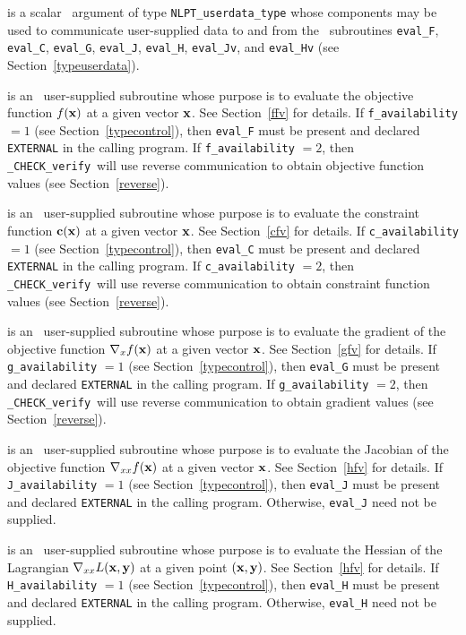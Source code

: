 \documentclass{galahad}
\newcommand{\packagename}{CHECK}
\newcommand{\fullpackagename}{\libraryname\_\packagename}
\newcommand{\solver}{{\tt \fullpackagename\_verify}}
\begin{document}
\begin{description}
 is a scalar \intentinout\ argument of type 
{\tt NLPT\_userdata\_type} whose components may be used
to communicate user-supplied data to and from the
\optional\ subroutines
{\tt eval\_F}, {\tt eval\_C}, {\tt eval\_G}, {\tt eval\_J},
{\tt eval\_H}, {\tt eval\_Jv}, and {\tt eval\_Hv}
(see Section~\ref{typeuserdata}). 

 is an \optional\ 
user-supplied subroutine whose purpose is to evaluate the 
objective function $f({\mathbf{x}})$ at a given vector ${\mathbf{x}}$.
See Section~\ref{ffv} for details.
If {\tt f\_availability} $=1$ (see Section~\ref{typecontrol}), then {\tt eval\_F}
must be present and declared {\tt EXTERNAL} in the calling program.
If {\tt f\_availability} $=2$, then \solver\ will use reverse communication to
obtain objective function values (see Section~\ref{reverse}).

 is an \optional\ 
user-supplied subroutine whose purpose is to evaluate the 
constraint function ${\mathbf{c}}({\mathbf{x}})$ at a given vector ${\mathbf{x}}$.
See Section~\ref{cfv} for details.
If {\tt c\_availability} $=1$ (see Section~\ref{typecontrol}), then {\tt eval\_C} must be present 
and declared {\tt EXTERNAL} in the calling program.
If {\tt c\_availability} $=2$, then \solver\ will use reverse communication to
obtain constraint function values (see Section~\ref{reverse}).

 is an \optional\ 
user-supplied subroutine whose purpose is to evaluate the  
gradient of the objective function $\nabla_x f({\mathbf{x}})$ at a given vector ${\mathbf{x}}$.
See Section~\ref{gfv} for details.
If {\tt g\_availability} $=1$ (see Section~\ref{typecontrol}), then {\tt eval\_G} must be present 
and declared {\tt EXTERNAL} in the calling program.
If {\tt g\_availability} $=2$, then \solver\ will use reverse communication to
obtain gradient values (see Section~\ref{reverse}).

\itt{eval\_J} is an \optional\ 
user-supplied subroutine whose purpose is to evaluate the 
Jacobian of the objective function $\nabla_{xx} f({\mathbf{x}})$ at a given vector ${\mathbf{x}}$.
See Section~\ref{hfv} for details.
If {\tt J\_availability} $=1$ (see Section~\ref{typecontrol}), then {\tt eval\_J} must be present and  
declared {\tt EXTERNAL} in the calling program.  Otherwise, {\tt eval\_J} need not be supplied.

\itt{eval\_H} is an \optional\ 
user-supplied subroutine whose purpose is to evaluate the
Hessian of the Lagrangian $\nabla_{xx} L({\mathbf{x}},{\mathbf{y}})$ at a given point $({\mathbf{x}},{\mathbf{y}})$.
See Section~\ref{hfv} for details.
If {\tt H\_availability} $=1$ (see Section~\ref{typecontrol}), then
{\tt eval\_H} must be present and  
declared {\tt EXTERNAL} in the calling program.  Otherwise, {\tt eval\_H} need not be supplied.


\end{description}
\end{document}
